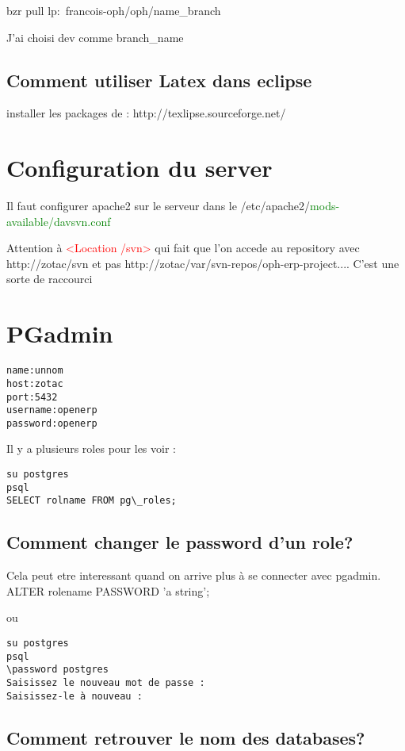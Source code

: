 \documentclass[12pt,a4paper]{article}
\begin{document}
bzr pull lp:~francois-oph/oph/name\_branch

J'ai choisi dev comme branch\_name

\subsection{Comment utiliser Latex dans eclipse}
\label{sec:eclipse_latex}
installer les packages de : http://texlipse.sourceforge.net/

\section{Configuration du server}
\label{sec:conf_server}
Il faut configurer apache2 sur le serveur dans le /etc/apache2/\textcolor{green}{mods-available/davsvn.conf}

Attention à \textcolor{red}{<Location /svn>} qui fait que l'on accede au repository avec http://zotac/svn et pas http://zotac/var/svn-repos/oph-erp-project.... C'est une sorte de raccourci




\section{PGadmin}
\label{sec:pgadmin_remote}

\begin{alltt}
name:unnom
host:zotac
port: 5432
username: openerp
password: openerp
\end{alltt}

Il y a plusieurs roles pour les voir :
\begin{verbatim}
su postgres
psql
SELECT rolname FROM pg\_roles;
\end{verbatim}


\subsection{Comment changer le password d'un role?}
\label{sec:chpass}

Cela peut etre interessant quand on arrive plus à se connecter avec pgadmin.
ALTER rolename PASSWORD 'a string';

ou 
\begin{verbatim}
su postgres
psql
\password postgres
Saisissez le nouveau mot de passe :
Saisissez-le à nouveau :
\end{verbatim}
\subsection{Comment retrouver le nom des databases?}
\label{sec:databas_name}
\end{document}

